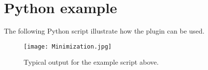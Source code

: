 \section{Python example}
The following Python script illustrate how the plugin can be used. 

\begin{singlespace}

\end{singlespace}

\begin{sidewaysfigure}
\centering
\texttt{[image: Minimization.jpg]}
\caption{Typical output for the example script above.}
\label{fig:lmfitFig}
\end{sidewaysfigure}






